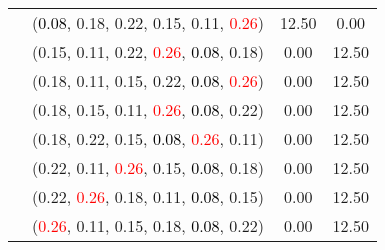 \documentclass[10pt,a4paper]{report}
\begin{document}
\begin{center}
\begin{longtable}{clcc}
			&(\textcolor{black}{0.08}, 0.18, 0.22, 0.15, 0.11, \textcolor{red}{0.26})&12.50&0.00\\
			&(0.15, 0.11, 0.22, \textcolor{red}{0.26}, \textcolor{black}{0.08}, 0.18)&0.00&12.50\\
			&(0.18, 0.11, 0.15, 0.22, \textcolor{black}{0.08}, \textcolor{red}{0.26})&0.00&12.50\\
			&(0.18, 0.15, 0.11, \textcolor{red}{0.26}, \textcolor{black}{0.08}, 0.22)&0.00&12.50\\
			&(0.18, 0.22, 0.15, \textcolor{black}{0.08}, \textcolor{red}{0.26}, 0.11)&0.00&12.50\\
			&(0.22, 0.11, \textcolor{red}{0.26}, 0.15, \textcolor{black}{0.08}, 0.18)&0.00&12.50\\
			&(0.22, \textcolor{red}{0.26}, 0.18, 0.11, \textcolor{black}{0.08}, 0.15)&0.00&12.50\\
			&(\textcolor{red}{0.26}, 0.11, 0.15, 0.18, \textcolor{black}{0.08}, 0.22)&0.00&12.50\\
		\bottomrule
	\end{longtable}
\end{center}
\end{document}
